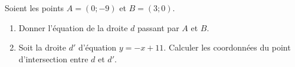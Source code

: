 
\begin{exercice}\label{exosmath-0450}

    Soient les points \( A=(0;-9)\) et \( B=(3;0)\).
    \begin{enumerate}
        \item
            Donner l'équation de la droite \( d\) passant par \( A\) et \( B\).
        \item
            Soit la droite \( d'\) d'équation \( y=-x+11\). Calculer les coordonnées du point d'intersection entre \( d\) et \( d'\).
    \end{enumerate}

\end{exercice}

